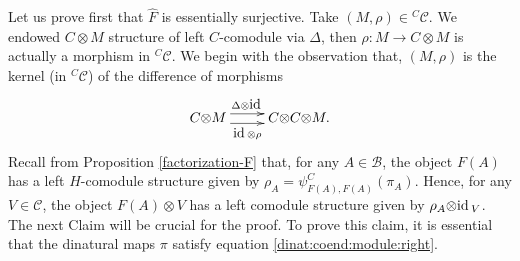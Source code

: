 \documentclass[11pt]{amsart}
\newcommand{\ot}{{\otimes}}
\newcommand{\vc}{{\mathcal C}}
\newcommand{\Bc}{{\mathcal B}}
\newcommand{\id}{\mbox{\rm id\,}}
\renewcommand{\_}[1]{\mbox{$_{\left( #1 \right)}$}}
\theoremstyle{plain}
\numberwithin{equation}{section}
\theoremstyle{definition}
\theoremstyle{remark}
\theoremstyle{introTheorems}
\begin{document}
\medbreak

Let us prove first that $\widehat{F}$ is essentially surjective. Take $(M,\rho)\in {}^C\vc$. We endowed $C\ot M$ structure of left $C$-comodule via $\Delta$, then $\rho:M\to C\ot M$ is actually a morphism in ${}^C\vc$. We begin with the observation that, $(M,\rho)$ is the kernel (in ${}^C\vc$) of the difference of morphisms
\begin{equation*}
\xymatrix{
 C \ot M \ar@<0.8ex>[r]^-{\,\, \Delta\ot \id\,\,}\ar@<-0.8ex>[r]_-{ \id\ot \rho}&  C \ot C \ot M.
}
\end{equation*}
Recall from Proposition \ref{factorization-F} that, for any $A\in \Bc$, the object $F(A)$ has a left $H$-comodule structure given by $\rho_A=\psi^C_{F(A),F(A)}(\pi_A).$ Hence, for any $V\in \vc$, the object $F(A)\ot V$ has a left comodule structure given by $\rho_A\ot\id_V$. The next Claim will be crucial for the proof. To prove this claim, it is essential that the dinatural maps $\pi$ satisfy equation \eqref{dinat:coend:module:right}.
\end{document}
